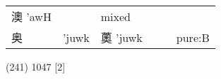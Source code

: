 \documentclass[14pt,a4paper]{scrartcl}
\begin{document}
\begin{longtable}[c]{@{}llllll@{}}
\begin{minipage}[t]{0.14\columnwidth}\raggedright\strut
澳 'awH
\strut\end{minipage} &
\begin{minipage}[t]{0.14\columnwidth}\raggedright\strut
\strut\end{minipage} &
\begin{minipage}[t]{0.14\columnwidth}\raggedright\strut
mixed
\strut\end{minipage}\tabularnewline
\begin{minipage}[t]{0.14\columnwidth}\raggedright\strut
奥
\strut\end{minipage} &
\begin{minipage}[t]{0.14\columnwidth}\raggedright\strut
'juwk
\strut\end{minipage} &
\begin{minipage}[t]{0.14\columnwidth}\raggedright\strut
薁 'juwk
\strut\end{minipage} &
\begin{minipage}[t]{0.14\columnwidth}\raggedright\strut
\strut\end{minipage} &
\begin{minipage}[t]{0.14\columnwidth}\raggedright\strut
\strut\end{minipage} &
\begin{minipage}[t]{0.14\columnwidth}\raggedright\strut
pure:B
\strut\end{minipage}\tabularnewline
\bottomrule
\end{longtable}

(241) 1047 {[}2{]}
\end{document}
